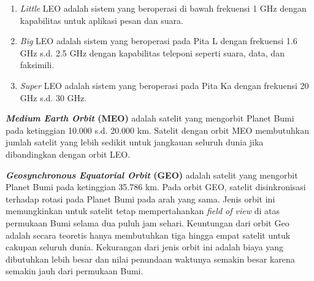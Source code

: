 \begin{enumerate}
	\item \textit{Little} LEO adalah sistem yang beroperasi di bawah frekuensi 1 GHz dengan kapabilitas untuk aplikasi pesan dan suara.
	\item \textit{Big} LEO adalah sistem yang beroperasi pada Pita L dengan frekuensi 1.6 GHz s.d. 2.5 GHz dengan kapabilitas teleponi seperti suara, data, dan faksimili.
	\item \textit{Super} LEO adalah sistem yang beroperasi pada Pita Ka dengan frekuensi 20 GHz s.d. 30 GHz.
\end{enumerate}

\textbf{\textit{Medium Earth Orbit} (MEO)} adalah satelit yang mengorbit Planet Bumi pada ketinggian 10.000 s.d. 20.000 km. Satelit dengan orbit MEO membutuhkan jumlah satelit yang lebih sedikit untuk jangkauan seluruh dunia jika dibandingkan dengan orbit LEO.

\textbf{\textit{Geosynchronous Equatorial Orbit} (GEO)} adalah satelit yang mengorbit Planet Bumi pada ketinggian 35.786 km. Pada orbit GEO, satelit disinkronisasi terhadap rotasi pada Planet Bumi pada arah yang sama. Jenis orbit ini memungkinkan untuk satelit tetap mempertahankan \textit{field of view} di atas permukaan Bumi selama dua puluh jam sehari. Keuntungan dari orbit Geo adalah secara teoretis hanya membutuhkan tiga hingga empat satelit untuk cakupan seluruh dunia. Kekurangan dari jenis orbit ini adalah biaya yang dibutuhkan lebih besar dan nilai penundaan waktunya semakin besar karena semakin jauh dari permukaan Bumi.

